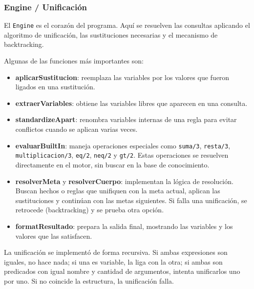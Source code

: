 \subsubsection{Engine / Unificación}

El \texttt{Engine} es el corazón del programa.  
Aquí se resuelven las consultas aplicando el algoritmo de unificación, las sustituciones necesarias y el mecanismo de backtracking.

Algunas de las funciones más importantes son:

\begin{itemize}
  \item \textbf{aplicarSustitucion}: reemplaza las variables por los valores que fueron ligados en una sustitución.
  \item \textbf{extraerVariables}: obtiene las variables libres que aparecen en una consulta.
  \item \textbf{standardizeApart}: renombra variables internas de una regla para evitar conflictos cuando se aplican varias veces.
  \item \textbf{evaluarBuiltIn}: maneja operaciones especiales como \texttt{suma/3}, \texttt{resta/3}, \texttt{multiplicacion/3}, \texttt{eq/2}, \texttt{neq/2} y \texttt{gt/2}.  
  Estas operaciones se resuelven directamente en el motor, sin buscar en la base de conocimiento.
  \item \textbf{resolverMeta} y \textbf{resolverCuerpo}: implementan la lógica de resolución.  
  Buscan hechos o reglas que unifiquen con la meta actual, aplican las sustituciones y continúan con las metas siguientes.  
  Si falla una unificación, se retrocede (backtracking) y se prueba otra opción.
  \item \textbf{formatResultado}: prepara la salida final, mostrando las variables y los valores que las satisfacen.
\end{itemize}

La unificación se implementó de forma recursiva.  
Si ambas expresiones son iguales, no hace nada; si una es variable, la liga con la otra;  
si ambas son predicados con igual nombre y cantidad de argumentos, intenta unificarlos uno por uno.  
Si no coincide la estructura, la unificación falla.